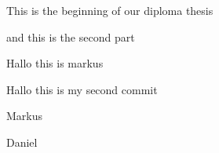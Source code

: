 \documentclass[11pt]{scrartcl}
\begin{document}
 
    This is the beginning of our diploma thesis

    and this is the second part
    
    Hallo this is markus

    Hallo this is my second commit

    Markus

    Daniel 
\end{document}
